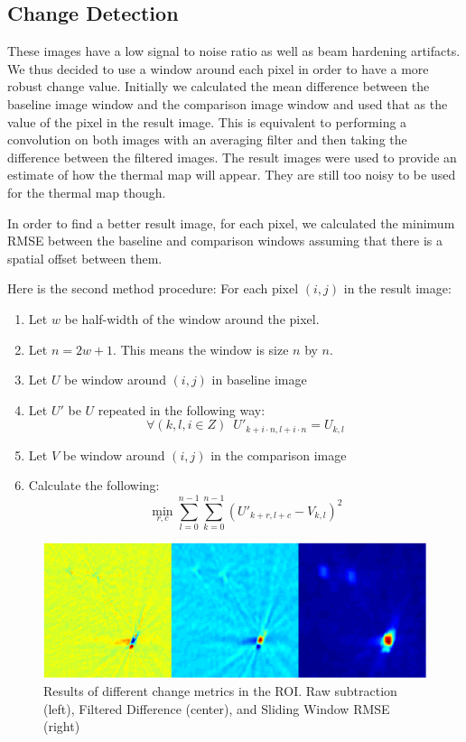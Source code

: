 \documentclass[]{spie}  %
\begin{document}
\subsection{Change Detection}

These images have a low signal to noise ratio as well as beam hardening artifacts. We thus decided to use a window around each pixel in order to have a more robust change value. Initially we calculated the mean difference between the baseline image window and the comparison image window and used that as the value of the pixel in the result image. This is equivalent to performing a convolution on both images with an averaging filter and then taking the difference between the filtered images. The result images were used to provide an estimate of how the thermal map will appear. They are still too noisy to be used for the thermal map though. 

In order to find a better result image, for each pixel, we calculated the minimum RMSE between the baseline and comparison windows assuming that there is a spatial offset between them. 

Here is the second method procedure:
For each pixel $(i,j)$ in the result image:
\begin{enumerate}
\item Let $w$ be half-width of the window around the pixel. 
\item Let $n=2w+1$. This means the window is size $n$ by $n$. 
\item Let $U$ be window around $(i,j)$ in baseline image
\item Let $U'$ be $U$ repeated in the following way:
\[
\forall(k,l,i \in Z)\, \, \, U'_{k+i \cdot n,l+i \cdot n} = U_{k,l}
\]
\item Let $V$ be window around $(i,j)$ in the comparison image
\item Calculate the following:
\[
\min_{r,c} \sum_{l=0}^{n-1} \sum_{k=0}^{n-1} {(U'_{k+r,l+c}-V_{k,l})^2}
\]

\end{enumerate}

\begin{figure} 
\centering 
\includegraphics[width=\textwidth]{changeDetectionPanel2.png} 
\caption{Results of different change metrics in the ROI. Raw subtraction (left), Filtered Difference (center), and Sliding Window RMSE (right)} 
\end{figure}
\end{document}
